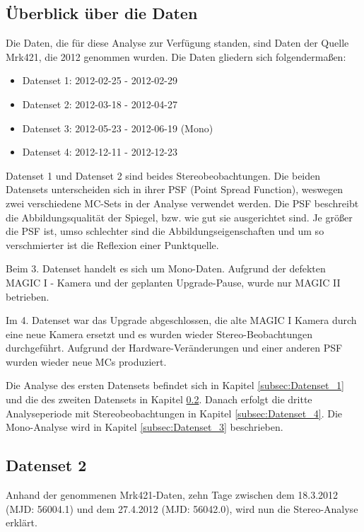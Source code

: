 \subsection{Überblick über die Daten}
Die Daten, die für diese Analyse zur Verfügung standen, sind Daten der Quelle Mrk421, die 2012 genommen wurden.
Die Daten gliedern sich folgendermaßen:

\begin{itemize}
 \item Datenset 1: 2012-02-25 - 2012-02-29
 \item Datenset 2: 2012-03-18 - 2012-04-27
 \item Datenset 3: 2012-05-23 - 2012-06-19 (Mono)
 \item Datenset 4: 2012-12-11 - 2012-12-23
\end{itemize}

Datenset 1 und Datenset 2 sind beides Stereobeobachtungen.
Die beiden Datensets unterscheiden sich in ihrer PSF (Point Spread Function), weswegen zwei verschiedene MC-Sets in der Analyse verwendet werden.
Die PSF beschreibt die Abbildungsqualität der Spiegel, bzw. wie gut sie ausgerichtet sind.
Je größer die PSF ist, umso schlechter sind die Abbildungseigenschaften und um so verschmierter ist die Reflexion einer Punktquelle.

Beim 3. Datenset handelt es sich um Mono-Daten. 
Aufgrund der defekten MAGIC I - Kamera und der geplanten Upgrade-Pause, wurde nur MAGIC II betrieben.

Im 4. Datenset war das Upgrade abgeschlossen, die alte MAGIC I Kamera durch eine neue Kamera ersetzt und es wurden wieder Stereo-Beobachtungen durchgeführt.
Aufgrund der Hardware-Veränderungen und einer anderen PSF wurden wieder neue MCs produziert.

Die Analyse des ersten Datensets befindet sich in Kapitel \ref{subsec:Datenset_1} und die des zweiten Datensets in Kapitel \ref{subsec:Datenset_2}.
Danach erfolgt die dritte Analyseperiode mit Stereobeobachtungen in Kapitel \ref{subsec:Datenset_4}.
Die Mono-Analyse wird in Kapitel \ref{subsec:Datenset_3} beschrieben.


\subsection{Datenset 2}
\label{subsec:Datenset_2}
Anhand der genommenen Mrk421-Daten, zehn Tage zwischen dem 18.3.2012 (MJD: 56004.1) und dem 27.4.2012 (MJD: 56042.0), wird nun die Stereo-Analyse erklärt.

